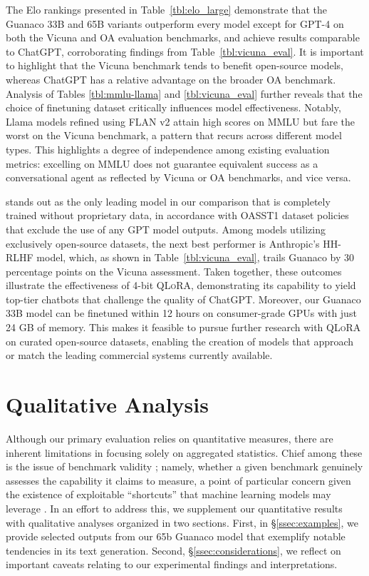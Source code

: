 The Elo rankings presented in Table~\ref{tbl:elo_large} demonstrate that the {Guanaco} 33B and 65B variants outperform every model except for GPT-4 on both the Vicuna and OA evaluation benchmarks, and achieve results comparable to ChatGPT, corroborating findings from Table~\ref{tbl:vicuna_eval}. It is important to highlight that the Vicuna benchmark tends to benefit open-source models, whereas ChatGPT has a relative advantage on the broader OA benchmark. Analysis of Tables \ref{tbl:mmlu-llama} and \ref{tbl:vicuna_eval} further reveals that the choice of finetuning dataset critically influences model effectiveness. Notably, Llama models refined using FLAN v2 attain high scores on MMLU but fare the worst on the Vicuna benchmark, a pattern that recurs across different model types. This highlights a degree of independence among existing evaluation metrics: excelling on MMLU does not guarantee equivalent success as a conversational agent as reflected by Vicuna or OA benchmarks, and vice versa.

stands out as the only leading model in our comparison that is completely trained without proprietary data, in accordance with OASST1 dataset policies that exclude the use of any GPT model outputs. Among models utilizing exclusively open-source datasets, the next best performer is Anthropic's HH-RLHF model, which, as shown in Table~\ref{tbl:vicuna_eval}, trails {Guanaco} by 30 percentage points on the Vicuna assessment. Taken together, these outcomes illustrate the effectiveness of 4-bit \textsc{QLoRA}, demonstrating its capability to yield top-tier chatbots that challenge the quality of ChatGPT. Moreover, our {Guanaco} 33B model can be finetuned within 12 hours on consumer-grade GPUs with just 24 GB of memory. This makes it feasible to pursue further research with \textsc{QLoRA} on curated open-source datasets, enabling the creation of models that approach or match the leading commercial systems currently available.

\section{Qualitative Analysis}

Although our primary evaluation relies on quantitative measures, there are inherent limitations in focusing solely on aggregated statistics. Chief among these is the issue of benchmark validity \citep{liao2021we}; namely, whether a given benchmark genuinely assesses the capability it claims to measure, a point of particular concern given the existence of exploitable “shortcuts” that machine learning models may leverage \citep{gururangan2018annotation, poliak2018hypothesis}. In an effort to address this, we supplement our quantitative results with qualitative analyses organized in two sections. First, in \S\ref{ssec:examples}, we provide selected outputs from our 65b {Guanaco} model that exemplify notable tendencies in its text generation. Second, \S\ref{ssec:considerations}, we reflect on important caveats relating to our experimental findings and interpretations.

